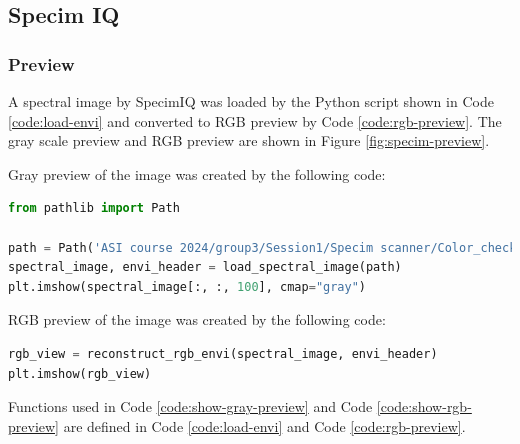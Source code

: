 \subsection{Specim IQ}

\subsubsection{Preview}

A spectral image by SpecimIQ was loaded by the Python script shown in
Code \ref{code:load-envi} and converted to RGB preview by Code
\ref{code:rgb-preview}. The gray scale preview and RGB preview are
shown in Figure \ref{fig:specim-preview}.

Gray preview of the image was created by the following code:

\begin{lstlisting}[language=python, caption=Show gray scale preview, label={code:show-gray-preview}]
from pathlib import Path

path = Path('ASI course 2024/group3/Session1/Specim scanner/Color_checker_8_binning/capture/solutions_scan_0110')
spectral_image, envi_header = load_spectral_image(path)
plt.imshow(spectral_image[:, :, 100], cmap="gray")
\end{lstlisting}

RGB preview of the image was created by the following code:

\begin{lstlisting}[language=python, caption=Show RGB preview, label={code:show-rgb-preview}]
rgb_view = reconstruct_rgb_envi(spectral_image, envi_header)
plt.imshow(rgb_view)
\end{lstlisting}

Functions used in Code \ref{code:show-gray-preview} and Code
\ref{code:show-rgb-preview} are defined in Code \ref{code:load-envi}
and Code \ref{code:rgb-preview}.

